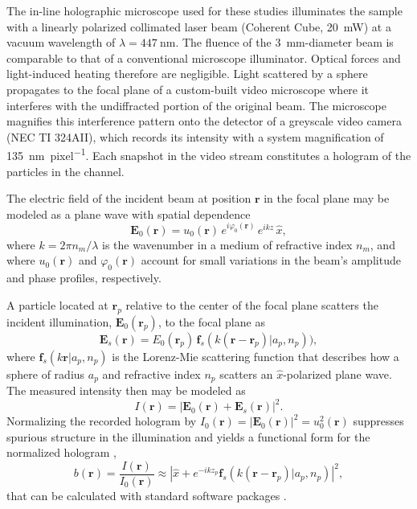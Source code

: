 \documentclass[10pt,letterpaper]{article}
\renewcommand{\vec}[1]{\mathbf{#1}}
\newcommand{\abs}[1]{\left\vert #1 \right\vert}
\begin{document}
The in-line holographic microscope used for these studies
\cite{lee07,lee07a,krishnatreya14} 
illuminates the sample with a linearly polarized collimated
laser beam (Coherent Cube, \SI{20}{\mW})
at a vacuum wavelength of
$\lambda = \SI{447}{\nm}$.
The fluence of the \SI{3}{\mm}-diameter beam
is comparable to that of a conventional microscope illuminator.
Optical forces and light-induced heating therefore are negligible.
Light scattered by a sphere
propagates to the focal plane of a custom-built video microscope \cite{krishnatreya14}
where it interferes with the undiffracted portion of the original beam.
The microscope magnifies this interference pattern onto the detector of a greyscale
video camera (NEC TI 324AII), which records its intensity with a system
magnification of \SI{135}{\nm\per pixel}.
Each snapshot in the video stream constitutes a hologram of
the particles in the channel.

The electric field of the incident beam at position $\vec{r}$ in the focal plane
may be modeled as a plane wave with spatial dependence
\begin{equation}
  \label{eq:incidentfield}
  \vec{E}_0(\vec{r}) = u_0(\vec{r}) \, e^{i \varphi_0(\vec{r})} \, e^{i k z} \, \hat{x},
\end{equation}
where $k = 2 \pi n_m / \lambda$ is
the wavenumber in a medium of refractive index $n_m$, and
where $u_0(\vec{r})$ and $\varphi_0(\vec{r})$ account for small variations in the beam's
amplitude and phase profiles, respectively.

A particle located at $\vec{r}_p$ relative to the center of the focal
plane scatters the incident illumination,
$\vec{E}_0(\vec{r}_p)$, to the focal plane as
\begin{equation}
  \label{eq:scatteredfield}
  \vec{E}_s(\vec{r}) 
  = 
  E_0(\vec{r}_p) \, 
  \vec{f}_s\!\left( k (\vec{r} - \vec{r}_p) \vert a_p, n_p \right)),
\end{equation}
where $\vec{f}_s(k\vec{r} \vert a_p, n_p)$ is the Lorenz-Mie scattering function 
\cite{bohren83} that describes how a
sphere of radius $a_p$ and refractive index $n_p$ scatters an $\hat{x}$-polarized plane wave.
The measured
intensity then may be modeled as
\begin{equation}
  \label{eq:intensity}
  I(\vec{r}) 
  = 
  \abs{\vec{E}_0(\vec{r}) + \vec{E}_s(\vec{r})}^2.
\end{equation}
Normalizing the recorded hologram
by $I_0(\vec{r}) = \abs{\vec{E}_0(\vec{r})}^2 = u_0^2(\vec{r})$
suppresses spurious
structure in the illumination
and yields a functional form for the normalized hologram
\cite{lee07a,krishnatreya14},
\begin{equation}
  b(\vec{r}) 
  = \frac{I(\vec{r})}{I_0(\vec{r})}
  \approx
  \abs{
    \hat{x} + 
    e^{-i k z_p} \vec{f}_s(k(\vec{r} - \vec{r}_p)
    \vert a_p, n_p)}^2,
  \label{eq:theory}
\end{equation}
that can be calculated with standard software packages \cite{software}.
\end{document}
